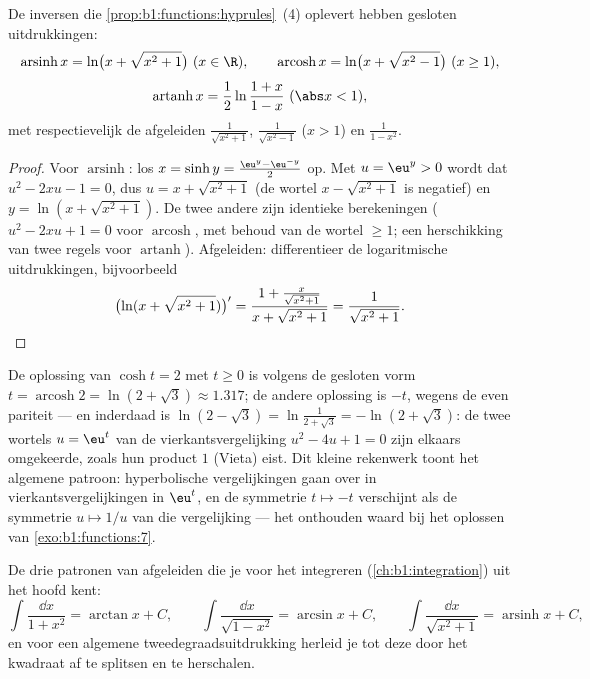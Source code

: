 \begin{proposition}\label{prop:b1:functions:invhyp}
De inversen die \cref{prop:b1:functions:hyprules}~(4) oplevert hebben
gesloten uitdrukkingen:
\[
\operatorname{arsinh} x = \ln\bigl(x + \sqrt{x^2 + 1}\bigr)
\ (x \in \R),
\qquad
\operatorname{arcosh} x = \ln\bigl(x + \sqrt{x^2 - 1}\bigr)
\ (x \geq 1),
\]
\[
\operatorname{artanh} x = \frac 12 \ln\frac{1 + x}{1 - x}
\ (\abs x < 1),
\]
met respectievelijk de afgeleiden $\frac{1}{\sqrt{x^2+1}}$,
$\frac{1}{\sqrt{x^2-1}}$ ($x > 1$) en $\frac{1}{1 - x^2}$.
\end{proposition}

\begin{proof}
Voor $\operatorname{arsinh}$: los $x = \sinh y = \frac{\eu^y -
\eu^{-y}}{2}$ op. Met $u = \eu^y > 0$ wordt dat $u^2 - 2xu - 1 = 0$, dus
$u = x + \sqrt{x^2 + 1}$ (de wortel $x - \sqrt{x^2+1}$ is negatief) en $y
= \ln(x + \sqrt{x^2+1})$. De twee andere zijn identieke berekeningen
($u^2 - 2xu + 1 = 0$ voor $\operatorname{arcosh}$, met behoud van de
wortel $\geq 1$; een herschikking van twee regels voor
$\operatorname{artanh}$). Afgeleiden: differentieer de logaritmische
uitdrukkingen, bijvoorbeeld
\[
\bigl(\ln(x + \sqrt{x^2+1})\bigr)'
= \frac{1 + \frac{x}{\sqrt{x^2+1}}}{x + \sqrt{x^2+1}}
= \frac{1}{\sqrt{x^2 + 1}} . \qedhere
\]
\end{proof}

\begin{example}\label{ex:b1:functions:arcoshtwo}
De oplossing van $\cosh t = 2$ met $t \geq 0$ is volgens de gesloten
vorm $t = \operatorname{arcosh} 2 = \ln(2 + \sqrt3) \approx 1.317$; de
andere oplossing is $-t$, wegens de even pariteit --- en inderdaad is
$\ln(2 - \sqrt3) = \ln\frac1{2 + \sqrt3} = -\ln(2 + \sqrt3)$: de twee
wortels $u = \eu^t$ van de vierkantsvergelijking $u^2 - 4u + 1 = 0$ zijn
elkaars omgekeerde, zoals hun product $1$ (Vieta) eist. Dit kleine
rekenwerk toont het algemene patroon: hyperbolische vergelijkingen gaan
over in vierkantsvergelijkingen in $\eu^t$, en de symmetrie $t \mapsto
-t$ verschijnt als de symmetrie $u \mapsto 1/u$ van die vergelijking ---
het onthouden waard bij het oplossen van \cref{exo:b1:functions:7}.
\end{example}

\begin{method}\label{met:b1:functions:primitive}
De drie patronen van afgeleiden die je voor het integreren
(\cref{ch:b1:integration}) uit het hoofd kent:
\[
\int \frac{\dd x}{1 + x^2} = \arctan x + C,
\qquad
\int \frac{\dd x}{\sqrt{1 - x^2}} = \arcsin x + C,
\qquad
\int \frac{\dd x}{\sqrt{x^2 + 1}} = \operatorname{arsinh} x + C,
\]
en voor een algemene tweedegraadsuitdrukking herleid je tot deze door
het kwadraat af te splitsen en te herschalen.
\end{method}

